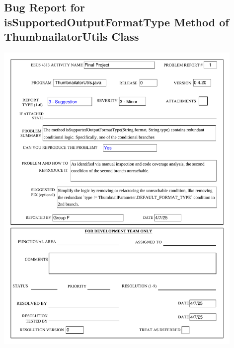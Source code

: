 \documentclass[12pt]{article}
\begin{document}
    \begin{appendices}
        \markboth{}{}
        \section{Bug Report for isSupportedOutputFormatType Method of ThumbnailatorUtils Class}
        \label{sec:appendix_a}
        \markboth{}{}
        \begin{center}
            \includegraphics[width=0.9\textwidth]{bug_reports/Bug_Report_1_print.pdf}
        \end{center}

        \markboth{}{}

\end{appendices}
\end{document}
